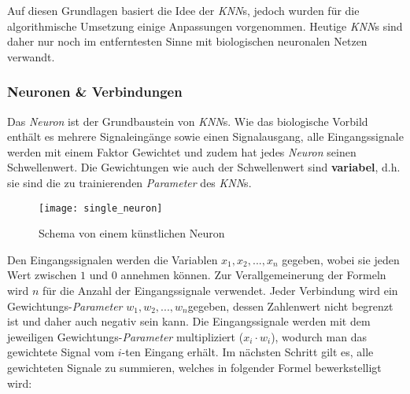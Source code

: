 Auf diesen Grundlagen basiert die Idee der \textit{KNN}s, jedoch wurden für die algorithmische Umsetzung einige Anpassungen vorgenommen. Heutige \textit{KNN}s sind daher nur noch im entferntesten Sinne mit biologischen neuronalen Netzen verwandt.

\subsubsection{Neuronen \& Verbindungen}\label{cha:theo:neurons}
Das \textit{Neuron} ist der Grundbaustein von \textit{KNN}s. Wie das biologische Vorbild enthält es mehrere Signaleingänge sowie einen Signalausgang, alle Eingangssignale werden mit einem Faktor Gewichtet und zudem hat jedes \textit{Neuron} seinen Schwellenwert. Die Gewichtungen wie auch der Schwellenwert sind \textbf{variabel}, d.h. sie sind die zu trainierenden \textit{Parameter} des \textit{KNN}s.
\begin{figure}[h]
	\centering
	\texttt{[image: single\_neuron]}
	\caption[Schema von einem künstlichen Neuron]{Schema von einem künstlichen Neuron}
	\label{img:single_neuron}
\end{figure}

Den Eingangssignalen werden die Variablen  $x_1, x_2,...,x_n$ gegeben, wobei sie jeden Wert zwischen $1$ und $0$ annehmen können. Zur Verallgemeinerung der Formeln wird $n$ für die Anzahl der Eingangssignale verwendet. Jeder Verbindung wird ein Gewichtungs-\textit{Parameter} $w_1, w_2,...,w_n$\footnotemark gegeben, dessen Zahlenwert nicht begrenzt ist und daher auch negativ sein kann. Die Eingangssignale werden mit dem jeweiligen Gewichtungs-\textit{Parameter} multipliziert ($x_i\cdot w_i$), wodurch man das gewichtete Signal vom $i$-ten Eingang erhält. Im nächsten Schritt gilt es, alle gewichteten Signale zu summieren, welches in folgender Formel bewerkstelligt wird:

	
